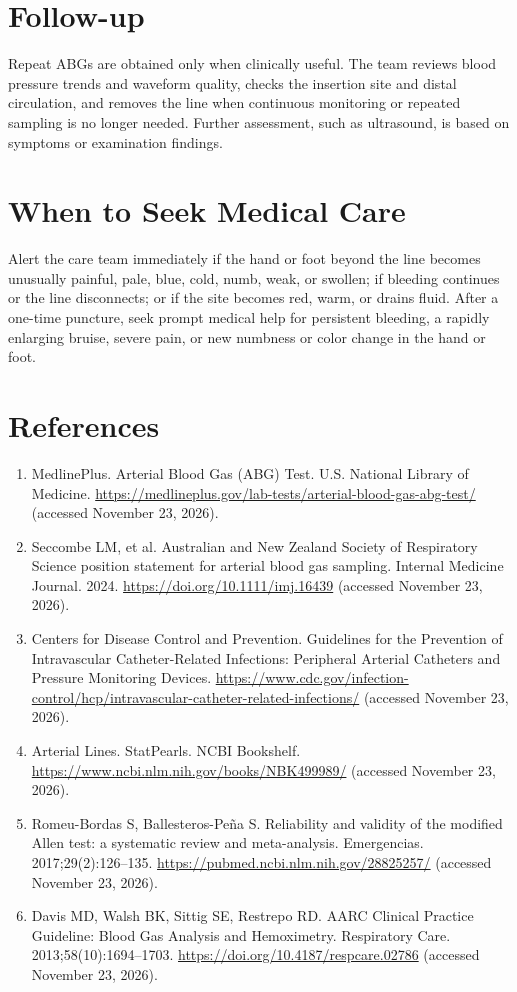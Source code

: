 \section*{Follow-up}
Repeat ABGs are obtained only when clinically useful. The team reviews blood pressure trends and waveform quality, checks the insertion site and distal circulation, and removes the line when continuous monitoring or repeated sampling is no longer needed. Further assessment, such as ultrasound, is based on symptoms or examination findings.

\section*{When to Seek Medical Care}
Alert the care team immediately if the hand or foot beyond the line becomes unusually painful, pale, blue, cold, numb, weak, or swollen; if bleeding continues or the line disconnects; or if the site becomes red, warm, or drains fluid. After a one-time puncture, seek prompt medical help for persistent bleeding, a rapidly enlarging bruise, severe pain, or new numbness or color change in the hand or foot.

\section*{References}
\begin{enumerate}
  \item MedlinePlus. Arterial Blood Gas (ABG) Test. U.S. National Library of Medicine. \url{https://medlineplus.gov/lab-tests/arterial-blood-gas-abg-test/} (accessed November 23, 2026).
  \item Seccombe LM, et al. Australian and New Zealand Society of Respiratory Science position statement for arterial blood gas sampling. Internal Medicine Journal. 2024. \url{https://doi.org/10.1111/imj.16439} (accessed November 23, 2026).
  \item Centers for Disease Control and Prevention. Guidelines for the Prevention of Intravascular Catheter-Related Infections: Peripheral Arterial Catheters and Pressure Monitoring Devices. \url{https://www.cdc.gov/infection-control/hcp/intravascular-catheter-related-infections/} (accessed November 23, 2026).
  \item Arterial Lines. StatPearls. NCBI Bookshelf. \url{https://www.ncbi.nlm.nih.gov/books/NBK499989/} (accessed November 23, 2026).
  \item Romeu-Bordas S, Ballesteros-Peña S. Reliability and validity of the modified Allen test: a systematic review and meta-analysis. Emergencias. 2017;29(2):126--135. \url{https://pubmed.ncbi.nlm.nih.gov/28825257/} (accessed November 23, 2026).
  \item Davis MD, Walsh BK, Sittig SE, Restrepo RD. AARC Clinical Practice Guideline: Blood Gas Analysis and Hemoximetry. Respiratory Care. 2013;58(10):1694--1703. \url{https://doi.org/10.4187/respcare.02786} (accessed November 23, 2026).
\end{enumerate}

\clearpage
